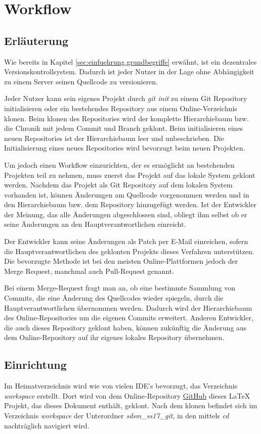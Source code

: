 \section{Workflow}

\subsection{Erläuterung}
Wie bereits in Kapitel \ref*{sec:einfuehrung.grundbegriffe} erwähnt, ist ein dezentrales Versionskontrollsystem. Dadurch ist jeder Nutzer in der Lage ohne Abhängigkeit zu einem Server seinen Quellcode zu versionieren.

Jeder Nutzer kann sein eigenes Projekt durch \textit{git init} zu einem Git Repository initialisieren oder ein bestehendes Repository aus einem Online-Verzeichnis klonen. Beim klonen des Repositories wird der komplette Hierarchiebaum bzw. die Chronik mit jedem Commit und Branch geklont. Beim initialisieren eines neuen Repositories ist der Hierarchiebaum leer und unbeschrieben. Die Initialisierung eines neues Repositories wird bevorzugt beim neuen Projekten.

Um jedoch einen Workflow einzurichten, der es ermöglicht an bestehenden Projekten teil zu nehmen, muss zuerst das Projekt auf das lokale System geklont werden. Nachdem das Projekt als Git Repository auf dem lokalen System vorhanden ist, können Änderungen am Quellcode vorgenommen werden und in den Hierarchiebaum bzw. dem Repository hinzugefügt werden. Ist der Entwickler der Meinung, das alle Änderungen abgeschlossen sind, obliegt ihm selbst ob er seine Änderungen an den Hauptverantwortlichen einreicht. 

Der Entwickler kann seine Änderungen als Patch per E-Mail einreichen, sofern die Hauptverantwortlichen des geklonten Projekts dieses Verfahren unterstützen. Die bevorzugte Methode ist bei den meisten Online-Plattformen jedoch der Merge Request, manchmal auch Pull-Request genannt. 

Bei einem Merge-Request fragt man an, ob eine bestimmte Sammlung von Commits, die eine Änderung des Quellcodes wieder spiegeln, durch die Hauptverantwortlichen übernommen werden. Dadurch wird der Hierarchiebaum des Online-Repositories um die eigenen Commits erweitert. Anderen Entwickler, die auch dieses Repository geklont haben, können zukünftig die Änderung aus dem Online-Repository auf ihr eigenes lokales Repository übernehmen.  

\subsection{Einrichtung}
Im Heimatverzeichnis wird wie von vielen IDE's bevorzugt, das Verzeichnis \textit{workspace} erstellt. Dort wird von dem Online-Repository \href{https://github.com}{GitHub} dieses \LaTeX{} Projekt, das dieses Dokument enthält, geklont. Nach dem klonen befindet sich im Verzeichnis \textit{workspace} der Unterordner \textit{sdsm\_ss17\_git}, in den mittels \textit{cd} nachträglich navigiert wird.


